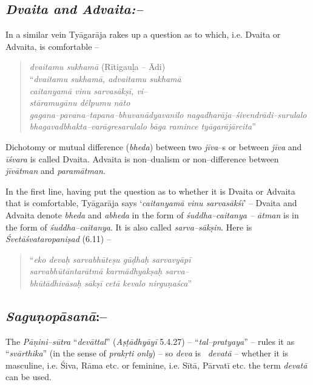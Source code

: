 \subsection*{\textit{Dvaita and Advaita:–}}

In a similar vein Tyāgarāja rakes up a question as to which, i.e. Dvaita or Advaita, is comfortable –

\begin{verse}
\textit{dvaitamu sukhamā} (Rītigauḷa – Ādi)\\ “\textit{dvaitamu sukhamā, advaitamu sukhamā}\\\textit{caitanyamā vinu sarvasākṣī, vi–}\\\textit{stāramugānu dêlpumu nāto}\\\textit{gagana–pavana–tapana–bhuvanādyavanilo nagadharāja–śivendrādi–surulalo}\\\textit{bhagavadbhakta–varāgresarulalo bāga ramince tyāgarājārcita}”
\end{verse}

Dichotomy or mutual difference (\textit{bheda}) between two \textit{jīva}–s or between \textit{jīva} and \textit{īśvara} is called Dvaita. Advaita is non–dualism or non–difference between \textit{jīvātman} and \textit{paramātman}. 

In the first line, having put the question as to whether it is Dvaita or Advaita that is comfortable, Tyāgarāja says ‘\textit{caitanyamā vinu sarvasākśī}’ – Dvaita and Advaita denote \textit{bheda} and \textit{abheda} in the form of \textit{śuddha–caitanya – ātman} is in the form of \textit{śuddha–caitanya}. It is also called \textit{sarva–sākṣin}. Here is \textit{Śvetāśvataropaniṣad} (6.11) –

\begin{verse}
“\textit{eko devaḥ sarvabhūteṣu gūḍhaḥ sarvavyāpī}\\\textit{sarvabhūtāntarātmā karmādhyakṣaḥ sarva–}\\\textit{bhūtādhivāsaḥ sākṣī cetā kevalo nirguṇaśca}”
\end{verse}


\subsection*{\textit{Saguṇopāsanā}:–}

The \textit{Pāṇini–sūtra} “\textit{devāttal}” (\textit{Aṣṭādhyāyī} 5.4.27) – “\textit{tal–pratyaya}” – rules it as “\textit{svārthika}” (in the sense of \textit{prakṛti only}) – so \textit{deva} is  \textit{devatā} – whether it is masculine, i.e. Śiva, Rāma etc. or feminine, i.e. Sītā\textit{,} Pārvatī etc. the term \textit{devatā} can be used. 

